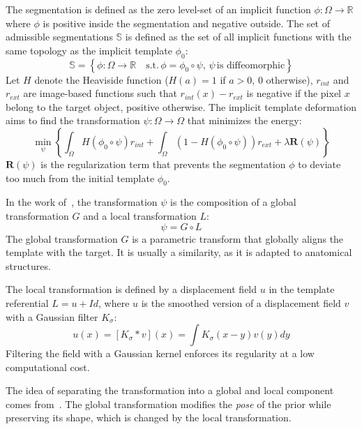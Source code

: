 The segmentation is defined as the zero level-set of an implicit function $\phi : \Omega \rightarrow \mathbb{R}$ where $\phi$ is positive inside the segmentation and negative outside. The set of admissible segmentations $\mathbb{S}$ is defined as the set of all implicit functions with the same topology as the implicit template $\phi_0$:
\begin{equation}
    \mathbb{S} = \left\{ \phi : \Omega \rightarrow \mathbb{R}\quad \text{s.t.}\, \phi = \phi_0 \circ \psi, \, \psi \, \text{is diffeomorphic} \right\}
\end{equation}
Let $H$ denote the Heaviside function ($H(a) = 1$ if $a > 0$, $0$ otherwise), $r_{int}$ and $r_{ext}$ are image-based functions such that $r_{int}(x) - r_{ext}$ is negative if the pixel $x$ belong to the target object, positive otherwise. The implicit template deformation aims to find the transformation $\psi : \Omega \rightarrow \Omega$ that minimizes the energy:
\begin{equation}
    \min_{\psi} \left\{ \int_{\Omega} H \left( \phi_0 \circ \psi \right) r_{int} + \int_{\Omega} \left( 1 - H \left( \phi_0 \circ \psi \right) \right) r_{ext} + \lambda \mathbf{R} \left( \psi \right) \right\}
    \label{eq:implicit}
\end{equation}
$\mathbf{R} \left( \psi \right)$ is the regularization term that prevents the segmentation $\phi$ to deviate too much from the initial template $\phi_0$.

In the work of~\textcite{mory2012MICCAI}, the transformation $\psi$ is the composition of a global transformation $G$ and a local transformation $L$:
\begin{equation}
    \psi = G \circ L
\end{equation}
The global transformation $G$ is a parametric transform that globally aligns the template with the target. It is usually a similarity, as it is adapted to anatomical structures.

The local transformation is defined by a displacement field $u$ in the template referential $L = u + Id$, where $u$ is the  smoothed version of a displacement field $v$ with a Gaussian filter $K_{\sigma}$:
\begin{equation}
    u(x) = [K_{\sigma} * v](x) = \int K_{\sigma}(x-y)v(y)dy
\end{equation}
Filtering the field with a Gaussian kernel enforces its regularity at a low computational cost.

The idea of separating the transformation into a global and local component comes from~\textcite{yezzi2003}. The global transformation modifies the \textit{pose} of the prior while preserving its shape, which is changed by the local transformation.

